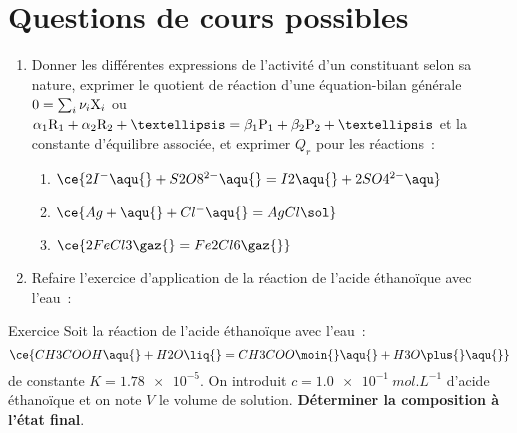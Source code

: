 \documentclass[a4paper, 12pt, final, garamond]{book}
\begin{document}
\section{Questions de cours possibles}
\begin{enumerate}
    \item Donner les différentes expressions de l'activité d'un constituant
        selon sa nature, exprimer le quotient de réaction d'une équation-bilan
        générale $0=\sum_i \nu_i{\rm X}_i$ ou $\alpha_1{\rm R}_1 + \alpha_2{\rm
        R}_2 + … = \beta_1{\rm P}_1 + \beta_2{\rm P}_2 + …$ et la constante
        d'équilibre associée, et exprimer $Q_r$ pour les réactions~:
        \begin{enumerate}
            \item $\ce{2I^-\aqu{} + S2O8^{2-}\aqu{} = I2\aqu{} +2SO4^{2-}\aqu}$
            \item $\ce{Ag+\aqu{} + Cl^-\aqu{} = AgCl\sol}$
            \item $\ce{2FeCl3\gaz{} = Fe2Cl6\gaz{}}$
        \end{enumerate}
    \item Refaire l'exercice d'application de la réaction de l'acide éthanoïque
        avec l'eau~:
\end{enumerate}
\begin{NCexem}[width=\linewidth, breakable]{Exercice}
    Soit la réaction de l'acide éthanoïque avec l'eau~:
    \[\ce{CH3COOH\aqu{} + H2O\liq{} = CH3COO\moin{}\aqu{} + H3O\plus{}\aqu{}}\]
    de constante $K = \num{1.78e-5}$. On introduit $c = \SI{1.0e-1}{mol.L^{-1}}$
    d'acide éthanoïque et on note $V$ le volume de solution. \textbf{Déterminer
    la composition à l'état final}.
\end{NCexem}
\end{document}
